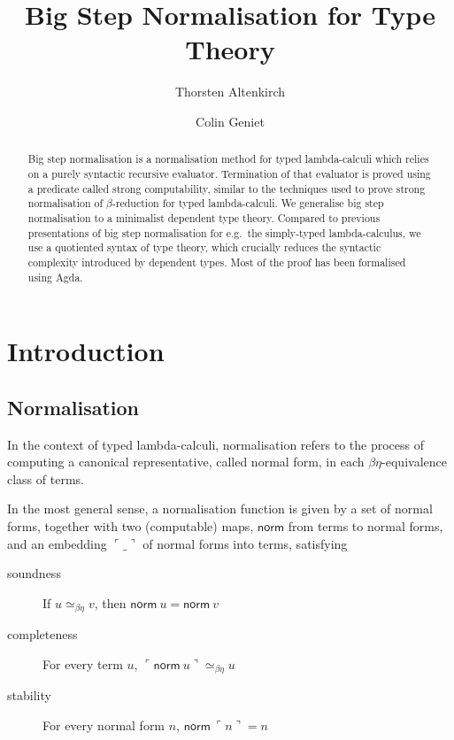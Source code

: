 \documentclass[a4paper,UKenglish,cleveref]{lipics-v2019}
\title{Big Step Normalisation for Type Theory}
\author{Thorsten Altenkirch}
{School for Computer Science, University of Nottingham, United Kingdom}
{txa@cs.nott.ac.uk}{}{}
\author{Colin Geniet}
{Computer Science Department, ENS Paris-Saclay, France}
{colin.geniet@ens-paris-saclay.fr}{}{}
\newcommand{\agdaSymb}[1]{\mathsf{#1}}
\newcommand{\norm}{\agdaSymb{norm}}
\newcommand{\cul}{\ulcorner}
\newcommand{\cur}{\urcorner}
\newcommand{\Beq}{\simeq_{\beta\eta}}
\begin{document}
\maketitle

\begin{abstract}
  Big step normalisation is a normalisation method for typed lambda-calculi
  which relies on a purely syntactic recursive evaluator. Termination of that
  evaluator is proved using a predicate called strong computability, similar to
  the techniques used to prove strong normalisation of $\beta$-reduction for
  typed lambda-calculi. We generalise big step normalisation to a minimalist
  dependent type theory. Compared to previous presentations of big step
  normalisation for e.g.\ the simply-typed lambda-calculus, we use a quotiented
  syntax of type theory, which crucially reduces the syntactic complexity
  introduced by dependent types. Most of the proof has been formalised using
  Agda.
\end{abstract}

\section{Introduction}
\subsection{Normalisation}
In the context of typed lambda-calculi, normalisation refers to the process of
computing a canonical representative, called normal form, in each
$\beta\eta$-equivalence class of terms.

In the most general sense, a normalisation function is given by a set of normal
forms, together with two (computable) maps, $\norm$ from terms to normal forms,
and an embedding $\cul\_\cur$ of normal forms into terms, satisfying
\begin{description}
\item[soundness] If $u \Beq v$, then $\norm\ u = \norm\ v$
\item[completeness] For every term $u$, $\cul \norm\ u \cur \Beq u$
\item[stability] For every normal form $n$, $\norm\ \cul n \cur = n$
\end{description}
\end{document}
